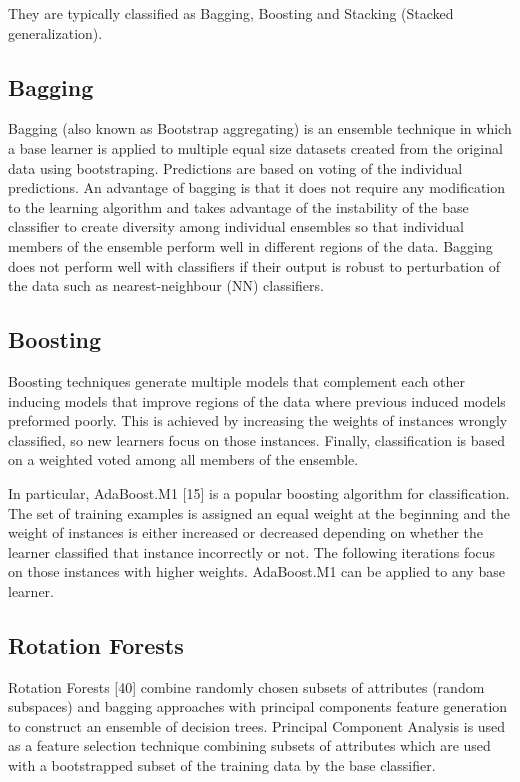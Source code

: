 \documentclass[]{book}
\begin{document}
They are typically classified as Bagging, Boosting and Stacking (Stacked
generalization).

\subsection{Bagging}\label{bagging}

Bagging (also known as Bootstrap aggregating) is an ensemble technique
in which a base learner is applied to multiple equal size datasets
created from the original data using bootstraping. Predictions are based
on voting of the individual predictions. An advantage of bagging is that
it does not require any modification to the learning algorithm and takes
advantage of the instability of the base classifier to create diversity
among individual ensembles so that individual members of the ensemble
perform well in different regions of the data. Bagging does not perform
well with classifiers if their output is robust to perturbation of the
data such as nearest-neighbour (NN) classifiers.

\subsection{Boosting}\label{boosting}

Boosting techniques generate multiple models that complement each other
inducing models that improve regions of the data where previous induced
models preformed poorly. This is achieved by increasing the weights of
instances wrongly classified, so new learners focus on those instances.
Finally, classification is based on a weighted voted among all members
of the ensemble.

In particular, AdaBoost.M1 {[}15{]} is a popular boosting algorithm for
classification. The set of training examples is assigned an equal weight
at the beginning and the weight of instances is either increased or
decreased depending on whether the learner classified that instance
incorrectly or not. The following iterations focus on those instances
with higher weights. AdaBoost.M1 can be applied to any base learner.

\subsection{Rotation Forests}\label{rotation-forests}

Rotation Forests {[}40{]} combine randomly chosen subsets of attributes
(random subspaces) and bagging approaches with principal components
feature generation to construct an ensemble of decision trees. Principal
Component Analysis is used as a feature selection technique combining
subsets of attributes which are used with a bootstrapped subset of the
training data by the base classifier.
\end{document}
